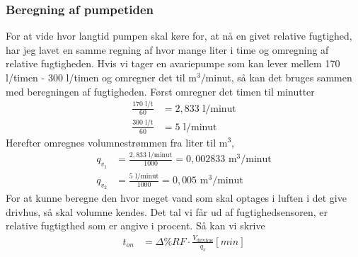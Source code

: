 \subsubsection{Beregning af pumpetiden}\label{subsubsec:beregning_af_pumpetiden}
For at vide hvor langtid pumpen skal køre for, at nå en givet relative fugtighed, 
har jeg lavet en samme regning af hvor mange liter i time og omregning af relative fugtigheden.
Hvis vi tager en avariepumpe som kan lever mellem 170 l/timen - 300 l/timen og omregner det til m$^3$/minut,
så kan det bruges sammen med beregningen af fugtigheden.
Først omregner det timen til minutter
\begin{align}
    \frac{170 \text{ l/t}}{60} &= 2,833 \text{ l/minut} \\
    \frac{300 \text{ l/t}}{60} &= 5 \text{ l/minut}
\end{align}
Herefter omregnes volumnestrømmen fra liter til m$^3$,
\begin{align}
    q_{v_1} &=\frac{2,833 \text{ l/minut}}{1000} = 0,002833 \text{ m$^3$/minut} \\
    q_{v_2} &= \frac{5 \text{ l/minut}}{1000} = 0,005 \text{ m$^3$/minut}
\end{align}
For at kunne beregne den hvor meget vand som skal optages i luften i det give drivhus, så skal volumne kendes. 
Det tal vi får ud af fugtighedsensoren, er relative fugtigthed som er angive i procent. 
Så kan vi skrive
\begin{align}
    t_{on} &= \Delta\%RF\cdot\frac{ V_{\text{drivhus}} }{ q_{v}  } [min]
\end{align}
